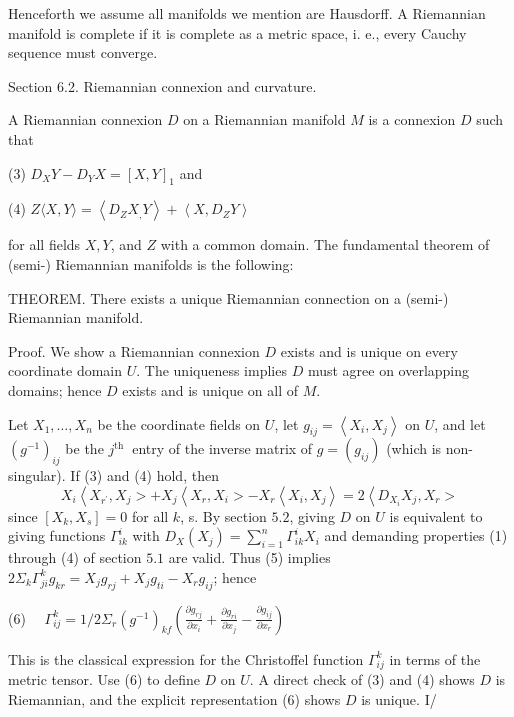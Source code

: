 \documentclass[10pt]{article}
\begin{document}
Henceforth we assume all manifolds we mention are Hausdorff. A Riemannian manifold is complete if it is complete as a metric space, i. e., every Cauchy sequence must converge.

Section 6.2. Riemannian connexion and curvature.

A Riemannian connexion $D$ on a Riemannian manifold $M$ is a connexion $D$ such that

(3) $D_{X} Y-D_{Y} X=[X, Y]_{1}$ and

(4) $Z\langle X, Y\rangle=\left\langle D_{Z} X_{,} Y\right\rangle+\left\langle X, D_{Z} Y\right\rangle$

for all fields $X, Y$, and $Z$ with a common domain. The fundamental theorem of (semi-) Riemannian manifolds is the following:

THEOREM. There exists a unique Riemannian connection on a (semi-) Riemannian manifold.

Proof. We show a Riemannian connexion $D$ exists and is unique on every coordinate domain $U$. The uniqueness implies $D$ must agree on overlapping domains; hence $D$ exists and is unique on all of $M$.

Let $X_{1}, \ldots, X_{n}$ be the coordinate fields on $U$, let $g_{i j}=\left\langle X_{i}, X_{j}\right\rangle$ on $U$, and let $\left(g^{-1}\right)_{i j}$ be the $j^{\text {th }}$ entry of the inverse matrix of $g=\left(g_{i j}\right)$ (which is non-singular). If (3) and (4) hold, then
$$
X_{i}\left\langle X_{r^{\prime}}, X_{j}>+X_{j}\left\langle X_{r}, X_{i}>-X_{r}\left\langle X_{i}, X_{j}\right\rangle=2\left\langle D_{X_{i}} X_{j}, X_{r}>\right.\right.\right.
$$
since $\left[X_{k}, X_{s}\right]=0$ for all $k$, s. By section $5.2$, giving $D$ on $U$ is equivalent to giving functions $\Gamma_{i k}^{i}$ with $D_{X}\left(X_{j}\right)=\sum_{i=1}^{n} \Gamma_{i k}^{i} X_{i}$ and demanding properties (1) through (4) of section $5.1$ are valid. Thus (5) implies $2 \Sigma_{k} \Gamma_{j i}^{k} g_{k r}=X_{j} g_{r j}+X_{j} g_{t i}-X_{r} g_{i j}$; hence

(6) $\quad \Gamma_{i j}^{k}=1 / 2 \Sigma_{r}\left(g^{-1}\right)_{k f}\left(\frac{\partial g_{r j}}{\partial x_{i}}+\frac{\partial g_{r i}}{\partial x_{j}}-\frac{\partial g_{i j}}{\partial x_{r}}\right)$

This is the classical expression for the Christoffel function $\Gamma_{i j}^{k}$ in terms of the metric tensor. Use (6) to define $D$ on $U$. A direct check of (3) and (4) shows $D$ is Riemannian, and the explicit representation (6) shows $D$ is unique. I/
\end{document}
